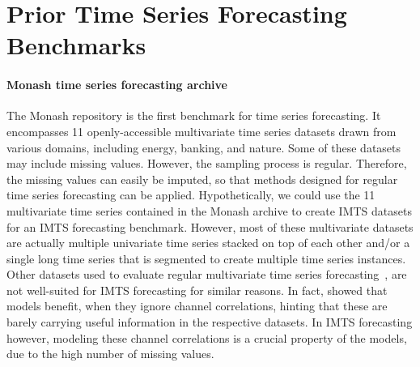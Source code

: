 \section{Prior Time Series Forecasting Benchmarks}\label{sec:related}
\paragraph{Monash time series forecasting archive~\citep{Godahewa2021.Monasha}}
The Monash repository is the first benchmark for time series forecasting.
It encompasses 11 openly-accessible multivariate time series datasets drawn from various
domains, including energy, banking, and nature. Some of these datasets may include
missing values. However, the sampling process is regular.
Therefore, the missing values can easily be imputed, so that methods designed for regular
time series forecasting can be applied.
Hypothetically, we could use the 11 multivariate time series contained in
the Monash archive to create IMTS datasets for an IMTS forecasting benchmark.
However, most of these multivariate datasets are actually multiple
univariate time series stacked on top of each other and/or a single
long time series that is segmented to create multiple time series instances.
Other datasets used to evaluate regular multivariate time series
forecasting~\citep{Nie2023.Time,Zeng2023.Are,Zhou2021.Informera},
are not well-suited for IMTS forecasting for similar reasons. In fact,
\citet{Nie2023.Time} showed that models benefit, when they ignore channel
correlations, hinting that these are barely carrying useful information in the
respective datasets. In IMTS forecasting however, modeling these channel correlations
is a crucial property of the models, due to the high number of missing values.

